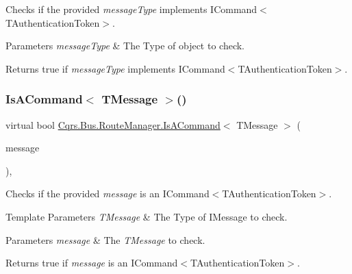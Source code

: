 Checks if the provided {\itshape message\+Type}  implements I\+Command$<$\+T\+Authentication\+Token$>$. 


\begin{DoxyParams}{Parameters}
{\em message\+Type} & The Type of object to check.\\
\hline
\end{DoxyParams}
\begin{DoxyReturn}{Returns}
true if {\itshape message\+Type}  implements I\+Command$<$\+T\+Authentication\+Token$>$.
\end{DoxyReturn}
\mbox{\label{classCqrs_1_1Bus_1_1RouteManager_a1ee8d583bb5d75a54cdac03c8e84b8d9_a1ee8d583bb5d75a54cdac03c8e84b8d9}} 
\subsubsection{\texorpdfstring{Is\+A\+Command$<$ T\+Message $>$()}{IsACommand< TMessage >()}}
{\footnotesize\ttfamily virtual bool \hyperlink{classCqrs_1_1Bus_1_1RouteManager_a7b7bfc4db30cc5956c4acd6a342e9159_a7b7bfc4db30cc5956c4acd6a342e9159}{Cqrs.\+Bus.\+Route\+Manager.\+Is\+A\+Command}$<$ T\+Message $>$ (\begin{DoxyParamCaption}\item[{T\+Message}]{message }\end{DoxyParamCaption})\hspace{0.3cm}{\ttfamily [protected]}, {\ttfamily [virtual]}}



Checks if the provided {\itshape message}  is an I\+Command$<$\+T\+Authentication\+Token$>$. 


\begin{DoxyTemplParams}{Template Parameters}
{\em T\+Message} & The Type of I\+Message to check.\\
\hline
\end{DoxyTemplParams}

\begin{DoxyParams}{Parameters}
{\em message} & The {\itshape T\+Message}  to check. \\
\hline
\end{DoxyParams}
\begin{DoxyReturn}{Returns}
true if {\itshape message}  is an I\+Command$<$\+T\+Authentication\+Token$>$.
\end{DoxyReturn}
\mbox{\label{classCqrs_1_1Bus_1_1RouteManager_a7b9b2ad8b9f5d7761b0f45c033b96101_a7b9b2ad8b9f5d7761b0f45c033b96101}} 
